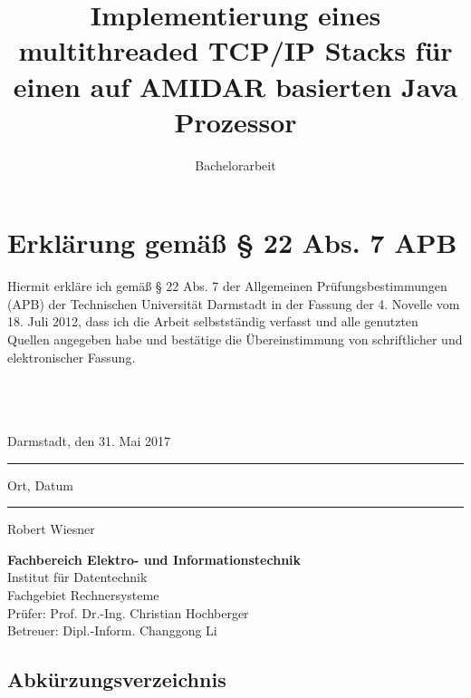 \documentclass[accentcolor=tud1c,colorback,ngerman,12pt] {tudreport}
\begin{document}
\title{Implementierung eines multithreaded TCP/IP Stacks für einen auf AMIDAR basierten Java Prozessor}
\subtitle{Bachelorarbeit}

\maketitle
\chapter*{Erklärung gemäß § 22 Abs. 7 APB}

Hiermit erkläre ich gemäß § 22 Abs. 7 der Allgemeinen Prüfungsbestimmungen (APB) der Technischen Universität Darmstadt in der Fassung der 4. Novelle vom 18. Juli 2012, dass ich die Arbeit selbstständig verfasst und alle genutzten Quellen angegeben habe und bestätige die Übereinstimmung von schriftlicher und elektronischer Fassung.\\ \\ \\ \\

\parbox{8cm}{\centering Darmstadt, den 31. Mai 2017\hrule
\strut \centering\footnotesize Ort, Datum} \hfill\parbox{8cm}{\phantom{Darmstadt, den 31. Mai 2017} \hrule
\strut \centering\footnotesize Robert Wiesner}

\vfill

\noindent \textbf{Fachbereich Elektro- und Informationstechnik}\\
Institut für Datentechnik\\
Fachgebiet Rechnersysteme\\
Prüfer: Prof. Dr.-Ing. Christian Hochberger\\
Betreuer: Dipl.-Inform. Changgong Li

\tableofcontents







\section*{Abkürzungsverzeichnis}
\begin{acronym}




\end{acronym}
\end{document}
